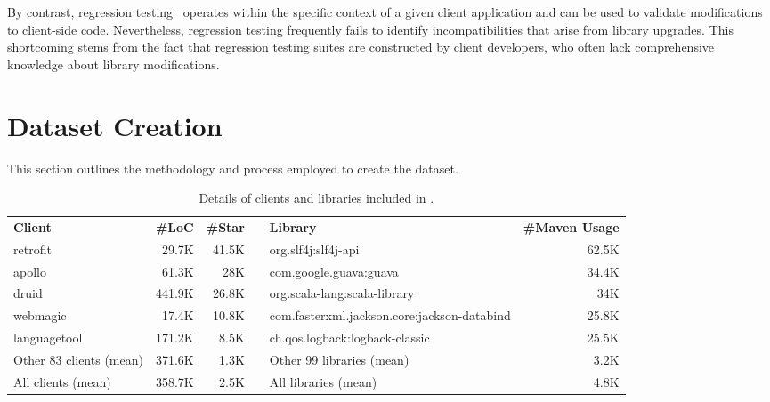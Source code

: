 By contrast, regression testing~\cite{yoo2012regression} operates within the specific context of a given client application and can be used to validate modifications to client-side code. Nevertheless, regression testing frequently fails to identify incompatibilities that arise from library upgrades. This shortcoming stems from the fact that regression testing suites are constructed by client developers, who often lack comprehensive knowledge about library modifications.




\section{Dataset Creation}\label{creation}

This section outlines the methodology and process employed to
create the \toolcompsuite dataset.

\begin{landscape}
\begin{table}
  \centering
    \setlength{\abovecaptionskip}{5pt}
    \caption{Details of clients and libraries included in \toolcompsuite.}
  \small
    \begin{tabular}{lrrclr}
        \cline{1-3} \cline{5-6}
        \textbf{Client}         & \textbf{\#LoC} & \textbf{\#Star} &  & \textbf{Library}                            & \textbf{\#Maven Usage} \\ \cline{1-3} \cline{5-6}
        retrofit                & 29.7K          & 41.5K           &  & org.slf4j:slf4j-api                         & 62.5K                   \\
        apollo                  & 61.3K          & 28K             &  & com.google.guava:guava                      & 34.4K                   \\
        druid                   & 441.9K         & 26.8K           &  & org.scala-lang:scala-library                & 34K                     \\
        webmagic                & 17.4K          & 10.8K           &  & com.fasterxml.jackson.core:jackson-databind & 25.8K                   \\
        languagetool            & 171.2K         & 8.5K            &  & ch.qos.logback:logback-classic              & 25.5K                   \\ \cline{1-3} \cline{5-6}
        Other 83 clients (mean) & 371.6K         & 1.3K            &  & Other 99 libraries (mean)                   & 3.2K                    \\ \cline{1-3} \cline{5-6}
        All clients (mean)      & 358.7K         & 2.5K            &  & All libraries (mean)                        & 4.8K                    \\ \cline{1-3} \cline{5-6}
    \end{tabular}
    \label{client-library}
\end{table}
\end{landscape}

